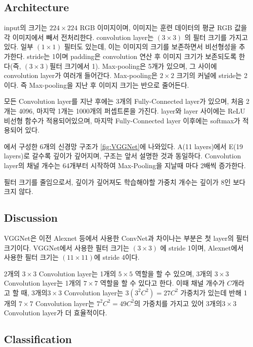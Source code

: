 \documentclass[extendedabs]{bmvc2k}
\begin{document}
\subsection{Architecture}
input의 크기는 $224 \times 224$ RGB 이미지이며, 이미지는 훈련 데이터의 평균 RGB 값을 각 이미지에서 빼서 전처리한다. convolution layer는 $(3 \times 3)$ 의 필터 크기를 가지고 있다. 일부 $(1 \times 1)$ 필터도 있는데, 이는 이미지의 크기를 보존하면서 비선형성을 추가한다. stride는 1이며 padding은 convolution 연산 후 이미지 크기가 보존되도록 한다(즉, $(3 \times 3)$필터 크기에서 1). Max-pooling은 5개가 있으며, 그 사이에 convolution layer가 여러개 들어간다. Max-pooling은 $2\times 2$ 크기의 커널에 stride는 2이다. 즉 Max-pooling을 지난 후 이미지 크기는 반으로 줄어든다. 

모든 Convolution layer를 지난 후에는 3개의 Fully-Connected layer가 있으며, 처음 2개는 4096, 마지막 1개는 1000개의 퍼셉트론을 가진다. layer와 layer 사이에는 ReLU\cite{AlexNet} 비선형 함수가 적용되어있으며, 마지막 Fully-Connected layer 이후에는 softmax가 적용되어 있다.

\cite{simonyan2015deepconvolutionalnetworkslargescale}에서 구성한 6개의 신경망 구조가 \ref{fig:VGGNet}에 나와있다. A(11 layers)에서 E(19 layers)로 갈수록 깊이가 깊어지며, 구조는 앞서 설명한 것과 동일하다. Convolution layer의 채널 개수는 64개부터 시작하여 Max-Pooling을 지날때 마다 2배씩 증가한다.

필터 크기를 줄임으로서, 깊이가 깊어져도 학습해야할 가중치 개수는 깊이가 8인 \cite{overfeat}보다 크지 않다.
\subsection{Discussion}
VGGNet은 이전 Alexnet\cite{AlexNet} 등에서 사용한 ConvNet과 차이나는 부분은 첫 layer의 필터 크기이다. VGGNet에서 사용한 필터 크기는 $(3\times 3)$ 에 stride 1이며, Alexnet\cite{AlexNet}에서 사용한 필터 크기는 $(11\times 11)$에 stride 4이다.

2개의 $3 \times 3$ Convolution layer는 1개의 $5\times 5$ 역할을 할 수 있으며, 3개의 $3 \times 3$ Convolution layer는 1개의 $7\times 7$ 역할을 할 수 있다고 한다. 이때 채널 개수가 $C$개라고 할 때, 3개의$ 3\times 3$ Convolution layer는 $3(3^2C^2)=27C^2$ 가중치가 있는데 반해 1개의 $7\times 7$ Convolution layer는 $7^2C^2=49C^2$의 가중치를 가지고 있어 3개의$ 3\times 3$ Convolution layer가 더 효율적이다.

\subsection{Classification}
\end{document}

